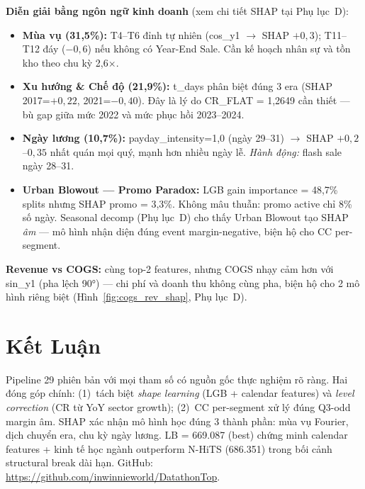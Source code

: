 \documentclass{article}
\begin{document}
\textbf{Diễn giải bằng ngôn ngữ kinh doanh} (xem chi tiết SHAP tại Phụ lục~D):
\begin{itemize}
  \item \textbf{Mùa vụ (31,5\%):} T4–T6 đỉnh tự nhiên (cos\_y1 $\to$ SHAP $+0,3$); T11–T12 đáy ($-0,6$) nếu không có Year-End Sale. Cần kế hoạch nhân sự và tồn kho theo chu kỳ 2,6×.
  \item \textbf{Xu hướng \& Chế độ (21,9\%):} t\_days phân biệt đúng 3 era (SHAP 2017=$+0,22$, 2021=$-0,40$). Đây là lý do CR\_FLAT = 1,2649 cần thiết — bù gap giữa mức 2022 và mức phục hồi 2023–2024.
  \item \textbf{Ngày lương (10,7\%):} payday\_intensity=1,0 (ngày 29–31) $\to$ SHAP $+0,2$–$0,35$ nhất quán mọi quý, mạnh hơn nhiều ngày lễ. \textit{Hành động:} flash sale ngày 28–31.
  \item \textbf{Urban Blowout — Promo Paradox:} LGB gain importance = 48,7\% splits nhưng SHAP promo = 3,3\%. Không mâu thuẫn: promo active chỉ 8\% số ngày. Seasonal decomp (Phụ lục~D) cho thấy Urban Blowout tạo SHAP \textit{âm} — mô hình nhận diện đúng event margin-negative, biện hộ cho CC per-segment.
\end{itemize}

\textbf{Revenue vs COGS:} cùng top-2 features, nhưng COGS nhạy cảm hơn với sin\_y1 (pha lệch 90°) — chi phí và doanh thu không cùng pha, biện hộ cho 2 mô hình riêng biệt (Hình~\ref{fig:cogs_rev_shap}, Phụ lục~D).

\section{Kết Luận}

\vspace{-2pt}
Pipeline 29 phiên bản với mọi tham số có nguồn gốc thực nghiệm rõ ràng. Hai đóng góp chính: (1)~tách biệt \textit{shape learning} (LGB + calendar features) và \textit{level correction} (CR từ YoY sector growth); (2)~CC per-segment xử lý đúng Q3-odd margin âm. SHAP xác nhận mô hình học đúng 3 thành phần: mùa vụ Fourier, dịch chuyển era, chu kỳ ngày lương. LB = 669.087 (best) chứng minh calendar features + kinh tế học ngành outperform N-HiTS (686.351) trong bối cảnh structural break dài hạn. GitHub: \url{https://github.com/inwinnieworld/DatathonTop}.

\end{document}
